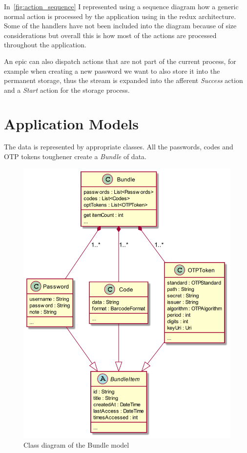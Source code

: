 \documentclass[a4paper,12pt]{report}
\begin{document}
In~\autoref{fig:action_sequence} I represented using a sequence diagram how a
generic normal action is processed by the application using in the redux
architecture. Some of the handlers have not been included into the diagram
because of size considerations but overall this is how most of the actions are
processed throughout the application.

An epic can also dispatch actions that are not part of the current process, for
example when creating a new password we want to also store it into the
permanent storage, thus the stream is expanded into the afferent
\textit{Success} action and a \textit{Start} action for the storage process.

\section{Application Models}

The data is represented by appropriate classes. All the passwords, codes and
OTP tokens toughener create a \textit{Bundle} of data.

\begin{figure}[H]
    \centering
    \includegraphics[scale=0.4]{diagrams/class/bundle.png}
    \caption{Class diagram of the Bundle model}\label{fig:bundle}
\end{figure}
\end{document}
